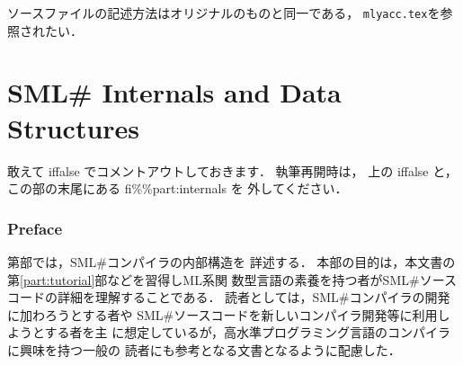 \documentclass{jbook}
\newif\ifjp
\newcommand{\txt}[2]{#2}
\newcommand{\smlsharp}{SML\#}
\newcommand{\code}[1]{\mbox{\large\tt #1}}
\begin{document}
	ソースファイルの記述方法はオリジナルのものと同一である，
\code{mlyacc.tex}を参照されたい．
\else%
\fi%

%
%	
%

% 
\ifjp%
\else%
\fi%

\part{\txt{\smlsharp{}の内部構造}{\smlsharp{} Internals and Data Structures}}
\label{part:internals}

\iffalse%
敢えて iffalse でコメントアウトしておきます．
執筆再開時は，
上の iffalse と，
この部の末尾にある fi\%\%part:internals を
外してください．

\section*{\txt{はじめに}{Preface}}
\ifjp%
	第\ref{part:internals}部では，\smlsharp{}コンパイラの内部構造を
詳述する．
	本部の目的は，本文書の第\ref{part:tutorial}部などを習得しML系関
数型言語の素養を持つ者が\smlsharp{}ソースコードの詳細を理解することである．
	読者としては，\smlsharp{}コンパイラの開発に加わろうとする者や
\smlsharp{}ソースコードを新しいコンパイラ開発等に利用しようとする者を主
に想定しているが，高水準プログラミング言語のコンパイラに興味を持つ一般の
読者にも参考となる文書となるように配慮した．
\end{document}
